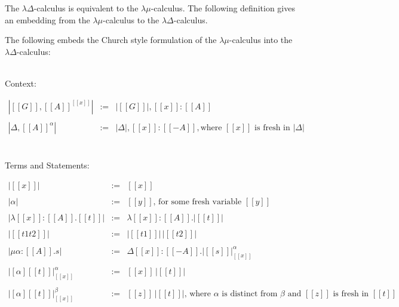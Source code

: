 The $\lambda\Delta$-calculus is equivalent to the $\lambda\mu$-calculus.  The
following definition gives an embedding from the $\lambda\mu$-calculus to
the $\lambda\Delta$-calculus.
\begin{definition}
  \label{def:lamd_embed_lamu}
  The following embeds the Church style formulation of the $\lambda\mu$-calculus into
  the $\lambda\Delta$-calculus:
  
  \ \\
  Context:
  \begin{center}
    \begin{math}
      \begin{array}{lll}
        |[[G]],[[A]]^[[x]]| & := & |[[G]]|,[[x]]:[[A]]\\
        &\\
        |\Delta,[[A]]^\alpha| & := & |\Delta|,[[x]]:[[{-A}]], \text{where } [[x]] \text{ is fresh in } |\Delta|\\
      \end{array}
    \end{math}
  \end{center}

  \ \\
  Terms and Statements:
  \begin{center}
    \begin{math}
      \begin{array}{lll}
        |[[x]]|  & := & [[x]]\\
        &\\
        |\alpha| & := & [[y]] \text{, for some fresh variable } [[y]]\\
        &\\
        |\lambda [[x]]:[[A]].[[t]]| & := & \lambda [[x]]:[[A]].|[[t]]|\\
        &\\
        |[[t1 t2]]|  & := & |[[t1]]|\,|[[t2]]|\\
        &\\
        |\mu \alpha:[[A]].s| & := & \Delta [[x]]:[[{-A}]].|[[s]]|^{\alpha}_{[[x]]} \\
        &\\
        |[\alpha][[t]]|^{\alpha}_{[[x]]} & := & [[x]]\,|[[t]]|\\          
        & \\
        |[\alpha][[t]]|^{\beta}_{[[x]]} & := & [[z]]\,|[[t]]|
          \text{, where } \alpha \text{ is distinct from } \beta \text{ and } [[z]] \text{ is fresh in } [[t]]
      \end{array}
    \end{math}
  \end{center}
\end{definition}

